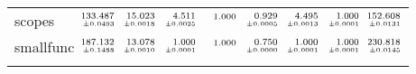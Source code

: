 \documentclass[a4paper,UKenglish]{lipics-v2016}
\begin{document}
\begin{table*}[t]
\begin{adjustbox}{width=1.2\textwidth,center}
\begin{tabular}{lrrrrrrrr}
\addlinespace
scopes&$\substack{\mathmakebox[.7cm][r]{133.487}\\{\mathmakebox[.7cm][r]{\scriptscriptstyle \pm 0.0493}}}$&$\substack{\mathmakebox[.7cm][r]{15.023}\\{\mathmakebox[.7cm][r]{\scriptscriptstyle \pm 0.0018}}}$&$\substack{\mathmakebox[.7cm][r]{4.511}\\{\mathmakebox[.7cm][r]{\scriptscriptstyle \pm 0.0025}}}$&$\substack{\mathmakebox[.7cm][r]{1.000}\\{\mathmakebox[.7cm][r]{\scriptscriptstyle }}}$&$\substack{\mathmakebox[.7cm][r]{0.929}\\{\mathmakebox[.7cm][r]{\scriptscriptstyle \pm 0.0005}}}$&$\substack{\mathmakebox[.7cm][r]{4.495}\\{\mathmakebox[.7cm][r]{\scriptscriptstyle \pm 0.0013}}}$&$\substack{\mathmakebox[.7cm][r]{1.000}\\{\mathmakebox[.7cm][r]{\scriptscriptstyle \pm 0.0001}}}$&$\substack{\mathmakebox[.7cm][r]{152.608}\\{\mathmakebox[.7cm][r]{\scriptscriptstyle \pm 0.0131}}}$\\
\addlinespace
smallfunc&$\substack{\mathmakebox[.7cm][r]{187.132}\\{\mathmakebox[.7cm][r]{\scriptscriptstyle \pm 0.1488}}}$&$\substack{\mathmakebox[.7cm][r]{13.078}\\{\mathmakebox[.7cm][r]{\scriptscriptstyle \pm 0.0010}}}$&$\substack{\mathmakebox[.7cm][r]{1.000}\\{\mathmakebox[.7cm][r]{\scriptscriptstyle \pm 0.0001}}}$&$\substack{\mathmakebox[.7cm][r]{1.000}\\{\mathmakebox[.7cm][r]{\scriptscriptstyle }}}$&$\substack{\mathmakebox[.7cm][r]{0.750}\\{\mathmakebox[.7cm][r]{\scriptscriptstyle \pm 0.0000}}}$&$\substack{\mathmakebox[.7cm][r]{1.000}\\{\mathmakebox[.7cm][r]{\scriptscriptstyle \pm 0.0001}}}$&$\substack{\mathmakebox[.7cm][r]{1.000}\\{\mathmakebox[.7cm][r]{\scriptscriptstyle \pm 0.0001}}}$&$\substack{\mathmakebox[.7cm][r]{230.818}\\{\mathmakebox[.7cm][r]{\scriptscriptstyle \pm 0.0145}}}$\\
\addlinespace

\end{tabular}
\end{adjustbox}
\end{table*}
\end{document}
